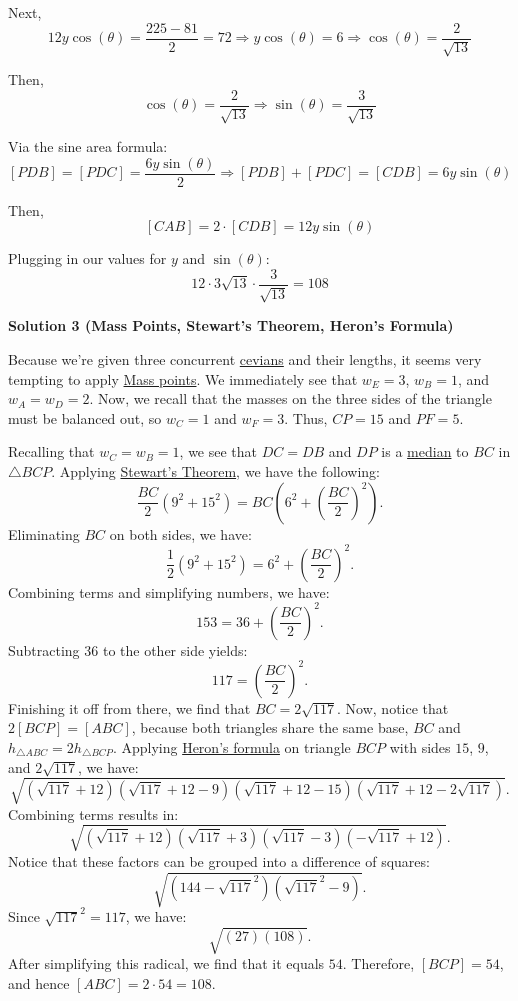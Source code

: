 \begin{enumerate}
 Next,
 \[12y\cos(\theta) = \frac{225 - 81}{2} = 72 \Rightarrow y\cos(\theta) = 6 \Rightarrow \cos(\theta) = \frac{2}{\sqrt{13}}\]

 Then,
 \[\cos(\theta) = \frac{2}{\sqrt{13}} \Rightarrow \sin(\theta) = \frac{3}{\sqrt{13}}\]

 Via the sine area formula:
 \[[PDB] = [PDC] = \frac{6y\sin(\theta)}{2} \Rightarrow [PDB] + [PDC] = [CDB] = 6y\sin(\theta)\]

 Then,
 \[[CAB] = 2 \cdot [CDB] = 12y\sin(\theta)\]

 Plugging in our values for $y$ and $\sin(\theta)$:
 \[12 \cdot 3\sqrt{13} \cdot \frac{3}{\sqrt{13}} = \boxed{108}\]




\textbf{Solution 3 (Mass Points, Stewart's Theorem, Heron's Formula)}

Because we're given three concurrent \href{https://artofproblemsolving.com/wiki/index.php?title=Cevian}{cevians} and their lengths, it seems very tempting to apply \href{https://artofproblemsolving.com/wiki/index.php?title=Mass\_points}{Mass points}. We immediately see that $w_E = 3$, $w_B = 1$, and $w_A = w_D = 2$. Now, we recall that the masses on the three sides of the triangle must be balanced out, so $w_C = 1$ and $w_F = 3$. Thus, $CP = 15$ and $PF = 5$. 

 Recalling that $w_C = w_B = 1$, we see that $DC = DB$ and $DP$ is a \href{https://artofproblemsolving.com/wiki/index.php?title=Median}{median} to $BC$ in $\triangle BCP$. Applying \href{https://artofproblemsolving.com/wiki/index.php?title=Stewart\%27s\_Theorem}{Stewart's Theorem}, we have the following:
 \[\frac{BC}{2}(9^2+15^2)=BC(6^2+ \left(\frac{BC}{2} \right)^2).\]Eliminating $BC$ on both sides, we have:
 \[\frac 12(9^2+15^2)=6^2+ \left(\frac{BC}{2} \right)^2.\]Combining terms and simplifying numbers, we have:
 \[153=36+\left(\frac{BC}{2} \right)^2.\]Subtracting 36 to the other side yields:
 \[117= \left(\frac{BC}{2} \right)^2.\]Finishing it off from there, we find that $BC=2 \sqrt{117}.$ Now, notice that $2[BCP] = [ABC]$, because both triangles share the same base, $BC$ and $h_{\triangle ABC} = 2h_{\triangle BCP}$. Applying \href{https://artofproblemsolving.com/wiki/index.php?title=Heron\%27s\_formula}{Heron's formula} on triangle $BCP$ with sides $15$, $9$, and $2\sqrt{117}$, we have:
 \[\sqrt{(\sqrt{117}+12)(\sqrt{117}+12-9)(\sqrt{117}+12-15)(\sqrt{117}+12-2\sqrt{117})}.\]Combining terms results in:
 \[\sqrt{(\sqrt{117}+12)(\sqrt{117}+3)(\sqrt{117}-3)(-\sqrt{117}+12)}.\]Notice that these factors can be grouped into a difference of squares:
 \[\sqrt{(144-\sqrt{117}^2)(\sqrt{117}^2-9)}.\]Since $\sqrt{117}^2=117$, we have:
 \[\sqrt{(27)(108)}.\]After simplifying this radical, we find that it equals $54.$ Therefore, $[BCP] = 54$, and hence $[ABC]=2 \cdot 54= \boxed{108}$.


\end{enumerate}
